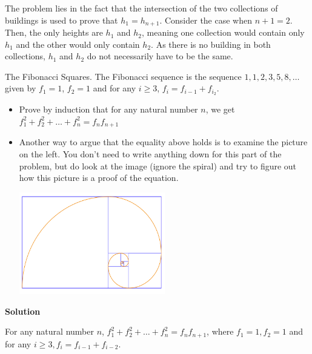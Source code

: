 \documentclass[11pt]{scrartcl}
\theoremstyle{dotlessP}
\theoremstyle{dotlessN}
\begin{document}
The problem lies in the fact that the intersection of the two collections of buildings is used to prove that $h_1 = h_{n+1}$.  Consider the case when $n+1 = 2$. Then, the only heights are  $h_1$ and $h_2$, meaning one collection would contain only $h_1$ and the other would only contain $h_2$. As there is no building in both collections, $h_1$ and $h_2$ do not necessarily have to be the same. 
\begin{ques}
	 The Fibonacci Squares. The Fibonacci sequence is the sequence $1,1,2,3,5,8,\dots$ given by $f_1 = 1$, $f_2 = 1$ and for any $i \geq 3$, $f_i = f_{i-1} + f_{i_2}$. 
\begin{itemize}
    \item Prove by induction that for any natural number $n$, we get $f_1^2 + f_2^2 + \dots + f_n^2 = f_nf_{n+1}$
    \item Another way to argue that the equality above holds is to examine the picture on the left. You don't need to write anything down for this part of the problem, but do look at the image (ignore the spiral) and try to figure out how this picture is a proof of the equation. 
    \begin{center}
        \includegraphics[width=0.5\textwidth]{Immagine 2023-09-29 185814.png}
    \end{center}
\end{itemize}
\end{ques}
\textbf{Solution}
	\begin{claim*}
		For any natural number $n$, $f_1^2 + f_2^2 + \dots + f_n^2 = f_n f_{n+1}$, where $f_1 = 1, f_2 = 1$ and for any $i \geq 3, f_i = f_{i-1} + f_{i-2}$.
	\end{claim*}
\end{document}
